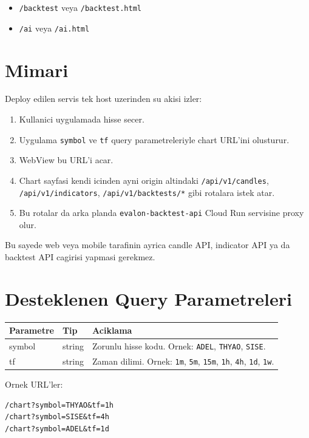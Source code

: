 \documentclass[11pt,a4paper]{article}
\begin{document}
\begin{itemize}
  \item \texttt{/backtest} veya \texttt{/backtest.html}
  \item \texttt{/ai} veya \texttt{/ai.html}
\end{itemize}

\section{Mimari}

Deploy edilen servis tek host uzerinden su akisi izler:

\begin{enumerate}
  \item Kullanici uygulamada hisse secer.
  \item Uygulama \texttt{symbol} ve \texttt{tf} query parametreleriyle chart URL'ini olusturur.
  \item WebView bu URL'i acar.
  \item Chart sayfasi kendi icinden ayni origin altindaki \texttt{/api/v1/candles}, \texttt{/api/v1/indicators}, \texttt{/api/v1/backtests/*} gibi rotalara istek atar.
  \item Bu rotalar da arka planda \texttt{evalon-backtest-api} Cloud Run servisine proxy olur.
\end{enumerate}

Bu sayede web veya mobile tarafinin ayrica candle API, indicator API ya da backtest API cagirisi yapmasi gerekmez.

\section{Desteklenen Query Parametreleri}

\begin{longtable}{|>{\ttfamily}p{3cm}|p{3cm}|p{7cm}|}
\hline
\textnormal{Parametre} & \textnormal{Tip} & \textnormal{Aciklama} \\
\hline
\textnormal{symbol} & string & Zorunlu hisse kodu. Ornek: \texttt{ADEL}, \texttt{THYAO}, \texttt{SISE}. \\
\hline
\textnormal{tf} & string & Zaman dilimi. Ornek: \texttt{1m}, \texttt{5m}, \texttt{15m}, \texttt{1h}, \texttt{4h}, \texttt{1d}, \texttt{1w}. \\
\hline
\end{longtable}

Ornek URL'ler:

\begin{lstlisting}[style=evalon]
/chart?symbol=THYAO&tf=1h
/chart?symbol=SISE&tf=4h
/chart?symbol=ADEL&tf=1d
\end{lstlisting}
\end{document}
